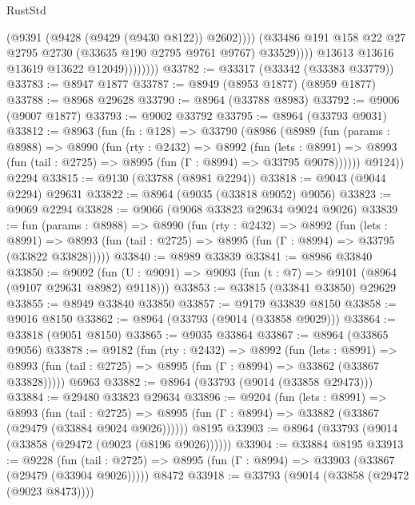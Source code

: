 \begin{lexlean}{RustStd}
\begin{coremodule}
                              (@9391 (@9428 (@9429 (@9430 @8122)) @2602))))
                          (@33486
                            @191
                            @158
                            @22
                            @27
                            @2795
                            @2730
                            (@33635 @190 @2795 @9761 @9767)
                            @33529))))
                    @13613
                    @13616
                    @13619
                    @13622
                    @12049))))))))
@33782 := @33317 (@33342 (@33383 @33779))
@33783 := @8947 @1877
@33787 := @8949 (@8953 @1877) (@8959 @1877)
@33788 := @8968 @29628
@33790 := @8964 (@33788 @8983)
@33792 := @9006 (@9007 @1877)
@33793 := @9002 @33792
@33795 := @8964 (@33793 @9031)
@33812 := @8963
    (fun (fn : @128) =>
    @33790
      (@8986
        (@8989
          (fun (params : @8988) =>
          @8990
            (fun (rty : @2432) =>
            @8992
              (fun (lets : @8991) =>
              @8993 (fun (tail : @2725) => @8995 (fun (Γ : @8994) => @33795 @9078))))))
        @9124))
    @2294
@33815 := @9130 (@33788 (@8981 @2294))
@33818 := @9043 (@9044 @2294) @29631
@33822 := @8964 (@9035 (@33818 @9052) @9056)
@33823 := @9069 @2294
@33828 := @9066 (@9068 @33823 @29634 @9024 @9026)
@33839 := fun (params : @8988) =>
  @8990
    (fun (rty : @2432) =>
    @8992
      (fun (lets : @8991) =>
      @8993 (fun (tail : @2725) => @8995 (fun (Γ : @8994) => @33795 (@33822 @33828)))))
@33840 := @8989 @33839
@33841 := @8986 @33840
@33850 := @9092
    (fun (U : @9091) => @9093 (fun (t : @7) => @9101 (@8964 (@9107 @29631 @8982) @9118)))
@33853 := @33815 (@33841 @33850) @29629
@33855 := @8949 @33840 @33850
@33857 := @9179 @33839 @8150
@33858 := @9016 @8150
@33862 := @8964 (@33793 (@9014 (@33858 @9029)))
@33864 := @33818 (@9051 @8150)
@33865 := @9035 @33864
@33867 := @8964 (@33865 @9056)
@33878 := @9182
    (fun (rty : @2432) =>
    @8992
      (fun (lets : @8991) =>
      @8993 (fun (tail : @2725) => @8995 (fun (Γ : @8994) => @33862 (@33867 @33828)))))
    @6963
@33882 := @8964 (@33793 (@9014 (@33858 @29473)))
@33884 := @29480 @33823 @29634
@33896 := @9204
    (fun (lets : @8991) =>
    @8993
      (fun (tail : @2725) =>
      @8995 (fun (Γ : @8994) => @33882 (@33867 (@29479 (@33884 @9024 @9026))))))
    @8195
@33903 := @8964 (@33793 (@9014 (@33858 (@29472 (@9023 (@8196 @9026))))))
@33904 := @33884 @8195
@33913 := @9228
    (fun (tail : @2725) => @8995 (fun (Γ : @8994) => @33903 (@33867 (@29479 (@33904 @9026)))))
    @8472
@33918 := @33793 (@9014 (@33858 (@29472 (@9023 @8473))))

\end{coremodule}
\end{lexlean}
